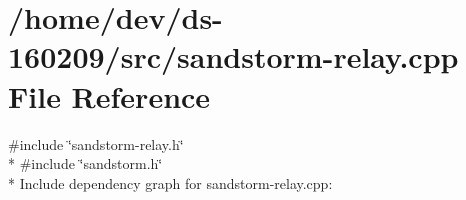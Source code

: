 \hypertarget{sandstorm-relay_8cpp}{}\section{/home/dev/ds-\/160209/src/sandstorm-\/relay.cpp File Reference}
\label{sandstorm-relay_8cpp}
{\ttfamily \#include \char`\"{}sandstorm-\/relay.\+h\char`\"{}}\\*
{\ttfamily \#include \char`\"{}sandstorm.\+h\char`\"{}}\\*
Include dependency graph for sandstorm-\/relay.cpp\+:
